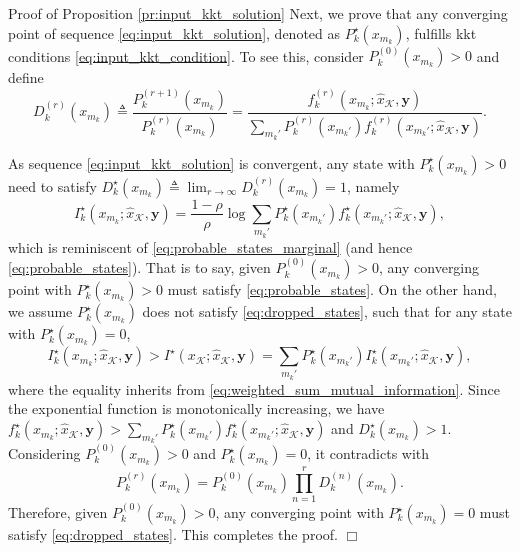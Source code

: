 \documentclass[journal]{IEEEtran}
\renewcommand{\qedsymbol}{\hfill\ensuremath{\Box}}
\begin{document}
\begin{appendix}
\begin{subsection}{Proof of Proposition \ref{pr:input_kkt_solution}}
		Next, we prove that any converging point of sequence \eqref{eq:input_kkt_solution}, denoted as $P_k^\star(x_{m_k})$, fulfills \gls{kkt} conditions \eqref{eq:input_kkt_condition}.
		To see this, consider $P_k^{(0)}(x_{m_k}) > 0$ and define
		\begin{equation}
			D_k^{(r)}(x_{m_k}) \triangleq \frac{P_k^{(r+1)}(x_{m_k})}{P_k^{(r)}(x_{m_k})} = \frac{f_k^{(r)}(x_{m_k};\hat{x}_{\mathcal{K}},\boldsymbol{y})}{\sum_{m_k'} P_k^{(r)}(x_{m_k'}) f_k^{(r)}(x_{m_k'};\hat{x}_{\mathcal{K}},\boldsymbol{y})}.
		\end{equation}

		As sequence \eqref{eq:input_kkt_solution} is convergent, any state with $P_k^\star(x_{m_k}) > 0$ need to satisfy $D_k^\star(x_{m_k}) \triangleq \lim_{r \to \infty} D_k^{(r)}(x_{m_k}) = 1$, namely
		\begin{equation}
			I_k^\star(x_{m_k};\hat{x}_{\mathcal{K}},\boldsymbol{y}) = \frac{1 - \rho}{\rho} \log \sum_{m_k'} P_k^\star(x_{m_k'}) f_k^\star(x_{m_k'};\hat{x}_{\mathcal{K}},\boldsymbol{y}),
		\end{equation}
		which is reminiscent of \eqref{eq:probable_states_marginal} (and hence \eqref{eq:probable_states}).
		That is to say, given $P_k^{(0)}(x_{m_k}) > 0$, any converging point with $P_k^\star(x_{m_k}) > 0$ must satisfy \eqref{eq:probable_states}.
		On the other hand, we assume $P_k^\star(x_{m_k})$ does not satisfy \eqref{eq:dropped_states}, such that for any state with $P_k^\star(x_{m_k}) = 0$,
		\begin{equation}
			I_k^\star(x_{m_k};\hat{x}_{\mathcal{K}},\boldsymbol{y}) > I^\star(x_{\mathcal{K}};\hat{x}_{\mathcal{K}},\boldsymbol{y}) = \sum_{m_k'} P_k^\star(x_{m_k'}) I_k^\star(x_{m_k'};\hat{x}_{\mathcal{K}},\boldsymbol{y}),
		\end{equation}
		where the equality inherits from \eqref{eq:weighted_sum_mutual_information}.
		Since the exponential function is monotonically increasing, we have $f_k^\star(x_{m_k};\hat{x}_{\mathcal{K}},\boldsymbol{y}) > \sum_{m_k'} P_k^\star(x_{m_k'}) f_k^\star(x_{m_k'};\hat{x}_{\mathcal{K}},\boldsymbol{y})$ and $D_k^\star(x_{m_k}) > 1$.
		Considering $P_k^{(0)}(x_{m_k}) > 0$ and $P_k^\star(x_{m_k}) = 0$, it contradicts with
		\begin{equation}
			P_k^{(r)}(x_{m_k}) = P_k^{(0)}(x_{m_k}) \prod_{n=1}^r D_k^{(n)}(x_{m_k}).
		\end{equation}
		Therefore, given $P_k^{(0)}(x_{m_k}) > 0$, any converging point with $P_k^\star(x_{m_k}) = 0$ must satisfy \eqref{eq:dropped_states}.
		This completes the proof.
		\qedsymbol
		\label{ap:input_kkt_solution}
	\end{subsection}


\end{appendix}
\end{document}
